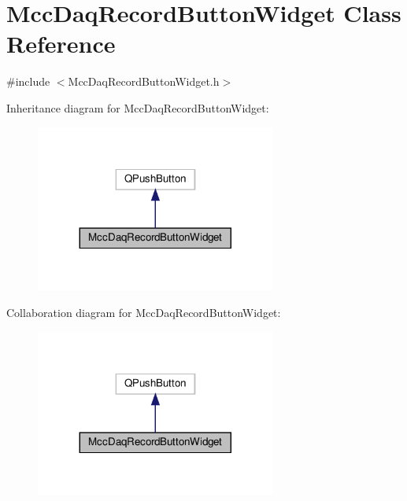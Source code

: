 \hypertarget{class_mcc_daq_record_button_widget}{}\section{Mcc\+Daq\+Record\+Button\+Widget Class Reference}
\label{class_mcc_daq_record_button_widget}


{\ttfamily \#include $<$Mcc\+Daq\+Record\+Button\+Widget.\+h$>$}



Inheritance diagram for Mcc\+Daq\+Record\+Button\+Widget\+:
\nopagebreak
\begin{figure}[H]
\begin{center}
\leavevmode
\includegraphics[width=224pt]{class_mcc_daq_record_button_widget__inherit__graph}
\end{center}
\end{figure}


Collaboration diagram for Mcc\+Daq\+Record\+Button\+Widget\+:
\nopagebreak
\begin{figure}[H]
\begin{center}
\leavevmode
\includegraphics[width=224pt]{class_mcc_daq_record_button_widget__coll__graph}
\end{center}
\end{figure}
